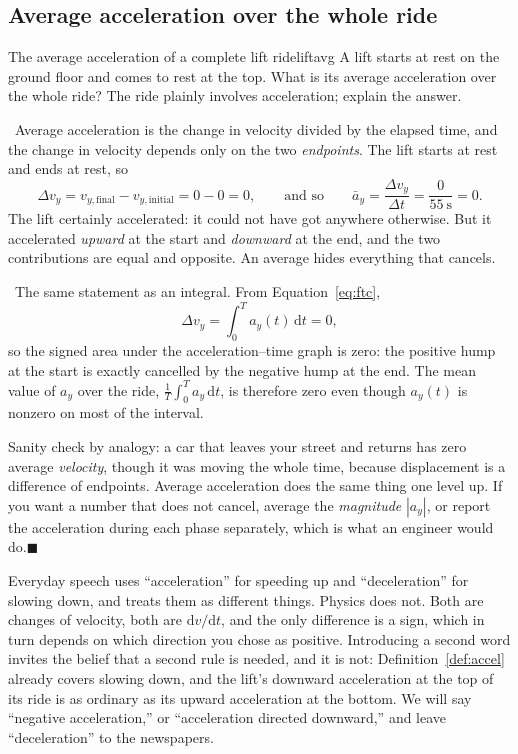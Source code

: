 \documentclass[11pt,twoside,openany]{book}
\newcommand{\dd}{\mathrm{d}}
\newcounter{check}[chapter]
\newcommand{\viewtag}[3]{\fcolorbox{#2}{#3}{\footnotesize\textbf{\textcolor{#2}{#1}}}}
\newcommand{\elemtag}{\viewtag{Elementary}{elemcol}{elempale}}
\newcommand{\calctag}{\viewtag{Calculus}{calccol}{calcpale}}
\newcommand{\elem}{\par\medskip\noindent\elemtag\ }
\newcommand{\calc}{\par\medskip\noindent\calctag\ }
\newcommand{\qed}{\hfill$\blacksquare$}
\begin{document}
\subsection{Average acceleration over the whole ride}

\begin{example}{The average acceleration of a complete lift ride}{liftavg}
A lift starts at rest on the ground floor and comes to rest at the top. What is its average acceleration over the whole ride? The ride plainly involves acceleration; explain the answer.

\elem Average acceleration is the change in velocity divided by the elapsed time, and the change in velocity depends only on the two \emph{endpoints}. The lift starts at rest and ends at rest, so
\[
\Delta v_y = v_{y,\text{final}} - v_{y,\text{initial}} = 0 - 0 = 0,
\qquad\text{and so}\qquad
\bar a_y = \frac{\Delta v_y}{\Delta t} = \frac{0}{\SI{55}{\second}} = 0 .
\]
The lift certainly accelerated: it could not have got anywhere otherwise. But it accelerated \emph{upward} at the start and \emph{downward} at the end, and the two contributions are equal and opposite. An average hides everything that cancels.

\calc The same statement as an integral. From Equation~\eqref{eq:ftc},
\[
\Delta v_y = \int_0^{T} a_y(t)\,\dd t = 0,
\]
so the signed area under the acceleration--time graph is zero: the positive hump at the start is exactly cancelled by the negative hump at the end. The mean value of $a_y$ over the ride, $\frac{1}{T}\int_0^T a_y\,\dd t$, is therefore zero even though $a_y(t)$ is nonzero on most of the interval.

Sanity check by analogy: a car that leaves your street and returns has zero average \emph{velocity}, though it was moving the whole time, because displacement is a difference of endpoints. Average acceleration does the same thing one level up. If you want a number that does not cancel, average the \emph{magnitude} $|a_y|$, or report the acceleration during each phase separately, which is what an engineer would do.\qed
\end{example}

\begin{modelnote}
Everyday speech uses ``acceleration'' for speeding up and ``deceleration'' for slowing down, and treats them as different things. Physics does not. Both are changes of velocity, both are $\dd v/\dd t$, and the only difference is a sign, which in turn depends on which direction you chose as positive. Introducing a second word invites the belief that a second rule is needed, and it is not: Definition~\ref{def:accel} already covers slowing down, and the lift's downward acceleration at the top of its ride is as ordinary as its upward acceleration at the bottom. We will say ``negative acceleration,'' or ``acceleration directed downward,'' and leave ``deceleration'' to the newspapers.
\end{modelnote}
\end{document}
